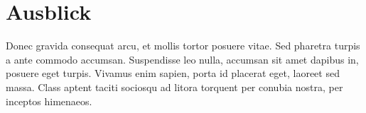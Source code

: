 \section{Ausblick}
\label{sec:chapter03:grafiken:minipage}
Donec gravida consequat arcu, et mollis tortor posuere vitae. Sed pharetra turpis a ante commodo accumsan. Suspendisse leo nulla, accumsan sit amet dapibus in, posuere eget turpis. Vivamus enim sapien, porta id placerat eget, laoreet sed massa. Class aptent taciti sociosqu ad litora torquent per conubia nostra, per inceptos himenaeos.

